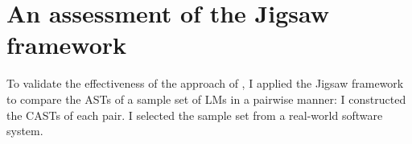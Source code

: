 \section{An assessment of the Jigsaw framework}\label{jigsaw-assessment}
%
%
%
%



To validate the effectiveness of the approach of \citet{2008:fse:cottrell}, I applied the Jigsaw framework to compare the ASTs of a sample set of LMs in a pairwise manner: I constructed the CASTs of each pair. I selected the sample set from a real-world software system. %


